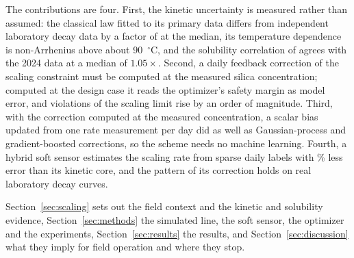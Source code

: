 The contributions are four. First, the kinetic uncertainty is measured
rather than assumed: the classical law fitted to its primary data
differs from independent laboratory decay data by a factor of
 at the median, its temperature dependence is non-Arrhenius
above about 90~$^{\circ}$C, and the solubility correlation of
\citet{gunnarsson2000amorphous} agrees with the 2024 data at a median of
$1.05\times$. Second, a daily feedback correction of the scaling
constraint must be computed at the measured silica concentration;
computed at the design case it reads the optimizer's safety margin as
model error, and violations of the scaling limit rise by an order of
magnitude. Third, with the correction computed at the measured
concentration, a scalar bias updated from one rate measurement per day
did as well as Gaussian-process and gradient-boosted corrections, so the
scheme needs no machine learning. Fourth, a hybrid soft sensor estimates
the scaling rate from sparse daily labels with \% less
error than its kinetic core, and the pattern of its correction holds on
real laboratory decay curves.

Section~\ref{sec:scaling} sets out the field context and the kinetic
and solubility evidence, Section~\ref{sec:methods} the simulated line,
the soft sensor, the optimizer and the experiments,
Section~\ref{sec:results} the results, and Section~\ref{sec:discussion}
what they imply for field operation and where they stop.

